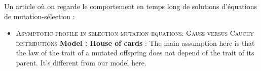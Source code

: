\documentclass{article}
\begin{document}
Un article où on regarde le comportement en temps long de solutions d'équations de mutation-sélection : 
\begin{itemize}
    \item \textsc{Asymptotic profile in selection-mutation equations: Gauss versus Cauchy distributions}
    \textbf{Model : House of cards} : The
main assumption here is that the law of the trait of a mutated offspring does not depend of the trait of its parent. It's different from our model here. 
\end{itemize}


 
\end{document}
